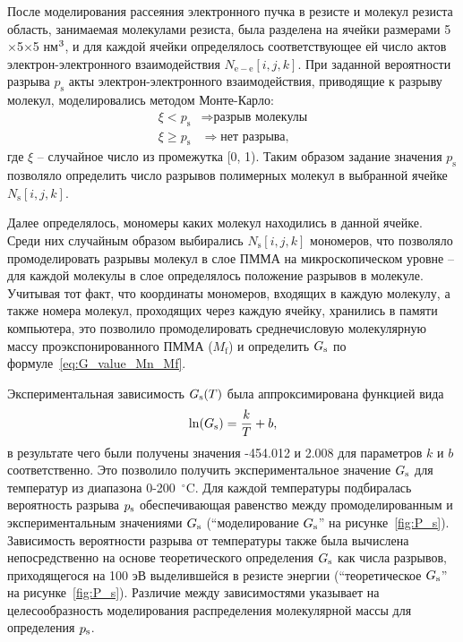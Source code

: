 После моделирования рассеяния электронного пучка в резисте и молекул резиста область, занимаемая молекулами резиста, была разделена на ячейки размерами 5$\times$5$\times$5 нм$^\text{3}$, и для каждой ячейки определялось соответствующее ей число актов электрон-электронного взаимодействия $N_{\mathrm{e}-\mathrm{e}}[i, j, k]$. При заданной вероятности разрыва $p_\mathrm{s}$ акты электрон-электронного взаимодействия, приводящие к разрыву молекул, моделировались методом Монте-Карло:
\begin{equation} \label{eq:MC_9}
	\begin{aligned}
		\xi < p_\mathrm{s} & \Rightarrow \text{разрыв молекулы} \\
		\xi \geq p_\mathrm{s} & \Rightarrow \text{нет разрыва},
	\end{aligned}
\end{equation}
где $\xi$ -- случайное число из промежутка [0, 1). Таким образом задание значения $p_\mathrm{s}$ позволяло определить число разрывов полимерных молекул в выбранной ячейке $N_\mathrm{s}[i, j, k]$.

Далее определялось, мономеры каких молекул находились в данной ячейке. Среди них случайным образом выбирались $N_\mathrm{s}[i, j, k]$ мономеров, что позволяло промоделировать разрывы молекул в слое ПММА на микроскопическом уровне -- для каждой молекулы в слое определялось положение разрывов в молекуле. Учитывая тот факт, что координаты мономеров, входящих в каждую молекулу, а также номера молекул, проходящих через каждую ячейку, хранились в памяти компьютера, это позволило промоделировать среднечисловую молекулярную массу проэкспонированного ПММА ($M_\mathrm{f}$) и определить $G_\mathrm{s}$ по формуле~\ref{eq:G_value_Mn_Mf}.

Экспериментальная зависимость $G_\mathrm{s}(T)$ была аппроксимирована функцией вида
\begin{equation}
	\ln(G_\mathrm{s}) = \frac{k}{T} + b,
\end{equation}
в результате чего были получены значения -454.012 и 2.008 для параметров $k$ и $b$ соответственно. Это позволило получить экспериментальное значение $G_\mathrm{s}$ для температур из диапазона 0-200~$^\circ$C. Для каждой температуры подбиралась вероятность разрыва $p_\mathrm{s}$ обеспечивающая равенство между промоделированным и экспериментальным значениями $G_\mathrm{s}$ (``моделирование $G_\mathrm{s}$'' на рисунке~\ref{fig:P_s}). Зависимость вероятности разрыва от температуры также была вычислена непосредственно на основе теоретического определения $G_\mathrm{s}$ как числа разрывов, приходящегося на 100 эВ выделившейся в резисте энергии (``теоретическое $G_\mathrm{s}$'' на рисунке~\ref{fig:P_s}). Различие между зависимостями указывает на целесообразность моделирования распределения молекулярной массы для определения $p_\mathrm{s}$.

